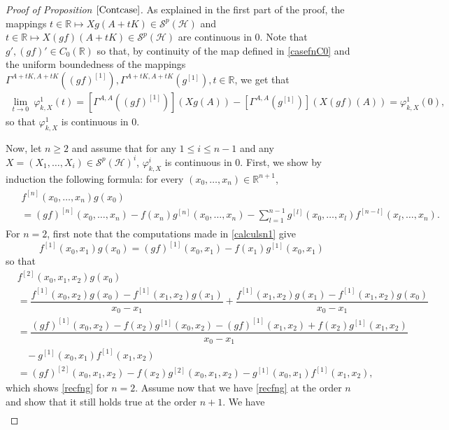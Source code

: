\documentclass[12pt]{amsart}
\theoremstyle{remark}
\begin{document}
\begin{proof}[Proof of Proposition $\ref{Contcase}$]
As explained in the first part of the proof, the mappings $t\in \mathbb{R} \mapsto Xg(A+tK) \in \mathcal{S}^p(\mathcal{H})$ and $t\in \mathbb{R} \mapsto X(gf)(A+tK) \in \mathcal{S}^p(\mathcal{H})$ are continuous in $0$. Note that $g', (gf)' \in C_0(\mathbb{R})$ so that, by continuity of the map defined in \eqref{casefnC0} and the uniform boundedness of the mappings $\Gamma^{A+tK, A+tK}((gf)^{[1]}), \Gamma^{A+tK, A+tK}(g^{[1]}), t\in \mathbb{R}$, we get that
\begin{align*}
\underset{t\to 0}{\lim} ~ \varphi_{k,X}^1(t) = \left[ \Gamma^{A, A}((gf)^{[1]}) \right](Xg(A)) - \left[ \Gamma^{A, A}(g^{[1]}) \right](X(gf)(A)) = \varphi_{k,X}^1(0),
\end{align*}
so that $\varphi_{k,X}^1$ is continuous in $0$.

Now, let $n\geq 2$ and assume that for any $1\leq i \leq n-1$ and any $X=(X_1,\ldots, X_{i}) \in \mathcal{S}^p(\mathcal{H})^i$, $\varphi_{k,X}^{i}$ is continuous in $0$. First, we show by induction the following formula: for every $(x_0,\ldots,x_n) \in \mathbb{R}^{n+1}$,
\begin{align}\label{recfng}
\begin{split}
& f^{[n]}(x_0, \ldots, x_n)g(x_0) \\
& = (gf)^{[n]}(x_0, \ldots, x_n) - f(x_n) g^{[n]}(x_0,\ldots, x_n) - \sum_{l=1}^{n-1} g^{[l]}(x_0, \ldots, x_l)f^{[n-l]}(x_{l} ,\ldots, x_n).
\end{split}
\end{align}
For $n=2$, first note that the computations made in \eqref{calculsn1} give
$$
f^{[1]}(x_0,x_1)g(x_0) = (gf)^{[1]}(x_0,x_1) - f(x_1)g^{[1]}(x_0,x_1)
$$
so that
\begin{align*}
& f^{[2]}(x_0,x_1,x_2)g(x_0) \\
& = \dfrac{f^{[1]}(x_0,x_2)g(x_0) - f^{[1]}(x_1,x_2)g(x_1)}{x_0-x_1} + \dfrac{f^{[1]}(x_1,x_2)g(x_1) - f^{[1]}(x_1,x_2)g(x_0)}{x_0-x_1} \\
& = \dfrac{(gf)^{[1]}(x_0,x_2) - f(x_2)g^{[1]}(x_0,x_2) - (gf)^{[1]}(x_1,x_2) + f(x_2)g^{[1]}(x_1,x_2)}{x_0-x_1} \\
& \ \ \ \ - g^{[1]}(x_0,x_1)f^{[1]}(x_1,x_2) \\
& = (gf)^{[2]}(x_0,x_1,x_2) - f(x_2) g^{[2]}(x_0,x_1,x_2) - g^{[1]}(x_0,x_1)f^{[1]}(x_1,x_2),
\end{align*}
which shows \eqref{recfng} for $n=2$. Assume now that we have \eqref{recfng} at the order $n$ and show that it still holds true at the order $n+1$. We have
\begin{align}\label{recu1}

\end{align}
\end{proof}
\end{document}
